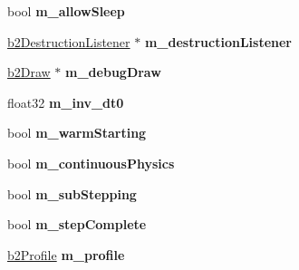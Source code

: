 \begin{DoxyCompactItemize}
\item 
bool {\bfseries m\+\_\+allow\+Sleep}\hypertarget{classb2_world_a5a31013145f978e964cfee64c3c46d7e}{}\label{classb2_world_a5a31013145f978e964cfee64c3c46d7e}

\item 
\hyperlink{classb2_destruction_listener}{b2\+Destruction\+Listener} $\ast$ {\bfseries m\+\_\+destruction\+Listener}\hypertarget{classb2_world_abf5abe16bd1ceef5ac15333042e71b4f}{}\label{classb2_world_abf5abe16bd1ceef5ac15333042e71b4f}

\item 
\hyperlink{classb2_draw}{b2\+Draw} $\ast$ {\bfseries m\+\_\+debug\+Draw}\hypertarget{classb2_world_a8937d34daab1ec7d2f6ee6dcbf5950a2}{}\label{classb2_world_a8937d34daab1ec7d2f6ee6dcbf5950a2}

\item 
float32 {\bfseries m\+\_\+inv\+\_\+dt0}\hypertarget{classb2_world_aaac593d6db2b19c648202dc326f88ba4}{}\label{classb2_world_aaac593d6db2b19c648202dc326f88ba4}

\item 
bool {\bfseries m\+\_\+warm\+Starting}\hypertarget{classb2_world_ab3c889781c1ad755f9f520f934e69b3d}{}\label{classb2_world_ab3c889781c1ad755f9f520f934e69b3d}

\item 
bool {\bfseries m\+\_\+continuous\+Physics}\hypertarget{classb2_world_a6546f4a56849f5635b4ed48f823be9e0}{}\label{classb2_world_a6546f4a56849f5635b4ed48f823be9e0}

\item 
bool {\bfseries m\+\_\+sub\+Stepping}\hypertarget{classb2_world_abfdc124ba03185a4b15cf220ebbacfe6}{}\label{classb2_world_abfdc124ba03185a4b15cf220ebbacfe6}

\item 
bool {\bfseries m\+\_\+step\+Complete}\hypertarget{classb2_world_ad2a6027e3148f79d1a7598db3941d10a}{}\label{classb2_world_ad2a6027e3148f79d1a7598db3941d10a}

\item 
\hyperlink{structb2_profile}{b2\+Profile} {\bfseries m\+\_\+profile}\hypertarget{classb2_world_a482ca7842f3e26343fe3091848d1cf3c}{}\label{classb2_world_a482ca7842f3e26343fe3091848d1cf3c}

\end{DoxyCompactItemize}
